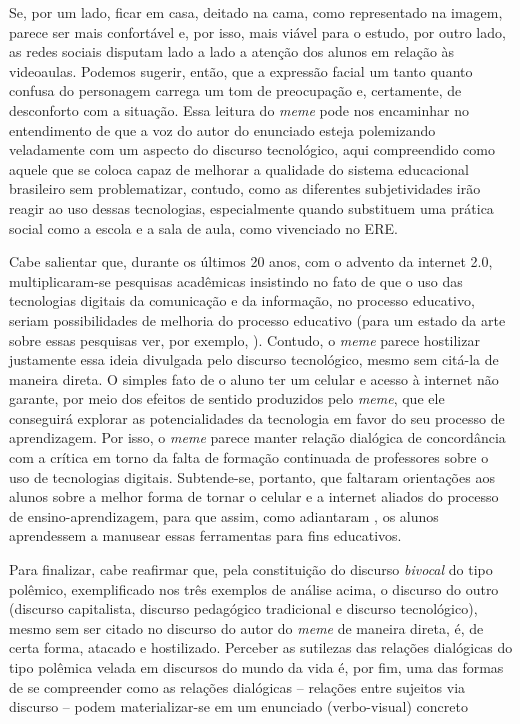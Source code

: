 \documentclass[portuguese]{textolivre}
\begin{document}
Se, por um lado, ficar em casa, deitado na cama, como representado na imagem, parece ser mais confortável e, por isso, mais viável para o estudo, por outro lado, as redes sociais disputam lado a lado a atenção dos alunos em relação às videoaulas. Podemos sugerir, então, que a expressão facial um tanto quanto confusa do personagem carrega um tom de preocupação e, certamente, de desconforto com a situação. Essa leitura do \textit{meme} pode nos encaminhar no entendimento de que a voz do autor do enunciado esteja polemizando veladamente com um aspecto do discurso tecnológico, aqui compreendido como aquele que se coloca capaz de melhorar a qualidade do sistema educacional brasileiro sem problematizar, contudo, como as diferentes subjetividades irão reagir ao uso dessas tecnologias, especialmente quando substituem uma prática social como a escola e a sala de aula, como vivenciado no ERE.
	
Cabe salientar que, durante os últimos 20 anos, com o advento da internet 2.0, multiplicaram-se pesquisas acadêmicas insistindo no fato de que o uso das tecnologias digitais da comunicação e da informação, no processo educativo, seriam possibilidades de melhoria do processo educativo (para um estado da arte sobre essas pesquisas ver, por exemplo, \textcite{menezes2019tecnologias}). Contudo, o \textit{meme} parece hostilizar justamente essa ideia divulgada pelo discurso tecnológico, mesmo sem citá-la de maneira direta. O simples fato de o aluno ter um celular e acesso à internet não garante, por meio dos efeitos de sentido produzidos pelo \textit{meme}, que ele conseguirá explorar as potencialidades da tecnologia em favor do seu processo de aprendizagem. Por isso, o \textit{meme} parece manter relação dialógica de concordância com a crítica em torno da falta de formação continuada de professores sobre o uso de tecnologias digitais. Subtende-se, portanto, que faltaram orientações aos alunos sobre a melhor forma de tornar o celular e a internet aliados do processo de ensino-aprendizagem, para que assim, como adiantaram \textcite{paes2020trabalho}, os alunos aprendessem a manusear essas ferramentas para fins educativos.
	
Para finalizar, cabe reafirmar que, pela constituição do discurso \textit{bivocal} do tipo polêmico, exemplificado nos três exemplos de análise acima, o discurso do outro (discurso capitalista, discurso pedagógico tradicional e discurso tecnológico), mesmo sem ser citado no discurso do autor do \textit{meme} de maneira direta, é, de certa forma, atacado e hostilizado. Perceber as sutilezas das relações dialógicas do tipo polêmica velada em discursos do mundo da vida é, por fim, uma das formas de se compreender como as relações dialógicas – relações entre sujeitos via discurso – podem materializar-se em um enunciado (verbo-visual) concreto
	
\end{document}
